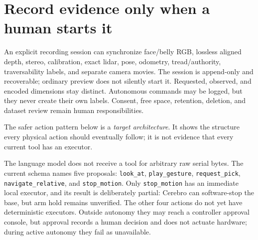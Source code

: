 \documentclass[11pt,openany]{book}
\begin{document}
\section*{Record evidence only when a human starts it}

An explicit recording session can synchronize face/belly RGB, lossless aligned depth, stereo, calibration, exact lidar, pose, odometry, tread/authority, traversability labels, and separate camera movies. The session is append-only and recoverable; ordinary preview does not silently start it. Requested, observed, and encoded dimensions stay distinct. Autonomous commands may be logged, but they never create their own labels. Consent, free space, retention, deletion, and dataset review remain human responsibilities.

The safer action pattern below is a \emph{target architecture}. It shows the structure every physical action should eventually follow; it is not evidence that every current tool has an executor.

\begin{center}
\end{center}

The language model does not receive a tool for arbitrary raw serial bytes. The current schema names five proposals: \texttt{look\_at}, \texttt{play\_gesture}, \texttt{request\_pick}, \texttt{navigate\_relative}, and \texttt{stop\_motion}. Only \texttt{stop\_motion} has an immediate local executor, and its result is deliberately partial: Cerebro can software-stop the base, but arm hold remains unverified. The other four actions do not yet have deterministic executors. Outside autonomy they may reach a controller approval console, but approval records a human decision and does not actuate hardware; during active autonomy they fail as unavailable.
\end{document}
